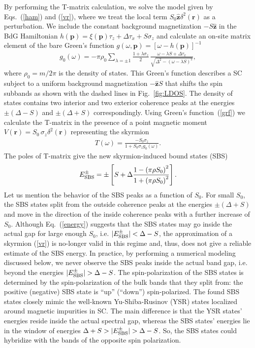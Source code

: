 \documentclass[twocolumn,showpacs,floatfix,longbibliography]{revtex4-1}
\begin{document}
By performing the T-matrix calculation, we solve the model given by Eqs.~(\ref{ham}) and (\ref{vr}), where we treat the local term $S_0 \hat{\bm z} \delta^2(\bm r)$ as a perturbation. We include the constant background magnetization $-S\hat{\bm z}$ in the BdG Hamiltonian $h(\bm p) = \xi(\bm p)\tau_z+\Delta \tau_x +  S\sigma_z$ and calculate an on-site matrix element of the bare Green's function $g(\omega,\bm p) = [\omega-h(\bm p)]^{-1}$ 
 \begin{align}
	 g_{0}(\omega)  =-\pi\rho_0\sum_{\lambda = \pm 1} \frac{1+\lambda\sigma_z}{2}\,\frac{\omega-\lambda S+\Delta\tau_x}{\sqrt{\Delta^2-\left( \omega-\lambda S \right)^2}},  \label{grf}
\end{align}
where $\rho_0 = m/2\pi$ is the density of states. This Green's function describes a SC subject to a uniform background magnetization $-\hat{\bm z} S$ that shifts the spin subbands as shown with the dashed lines in Fig.~\ref{fig:LDOS}.  The density of states contains two interior and two exterior coherence peaks at the energies $\pm(\Delta-S)$ and $\pm(\Delta+S)$ correspondingly.  Using Green's function~(\ref{grf}) we calculate the T-matrix in the presence of a point magnetic moment $V(\bm r)=S_0\,\sigma_z \delta^2(\bm r)$ representing the skyrmion
\begin{align}
	T(\omega) =   \frac{-S_0\sigma_z}{1+S_0\sigma_zg_{0}(\omega)}. \label{tm} 
\end{align}
The poles of T-matrix give the new skyrmion-induced bound states (SBS)
\begin{align}
	E^\pm_{\rm SBS} = \pm\left[S+\Delta \frac{1-\left( \pi\rho S_0 \right)^2}{1+\left( \pi\rho S_0 \right)^2}\right].
	\label{energy}
\end{align}
Let us mention the behavior of the SBS peaks as a function of $S_0$. For small $S_0$, the SBS states split from the outside coherence peaks at the energies $\pm (\Delta+S)$ and move in the direction of the inside coherence peaks with a further increase of $S_0$. Although Eq.~(\ref{energy}) suggests that the SBS states may go inside the actual gap for large enough  $S_0$, i.e. $|E^\pm_{\rm SBS}|<\Delta-S$, the approximation of a skyrmion (\ref{vr}) is no-longer valid in this regime and, thus, does not give a reliable estimate of the SBS energy. In practice, by performing a numerical modeling discussed below, we never observe the SBS peaks inside the actual band gap, i.e. beyond the energies $|E^\pm_{\rm SBS}|>\Delta-S$. The spin-polarization of the SBS states is determined by the spin-polarization of the bulk bands that they split from: the positive (negative) SBS state is ``up'' (``down'') spin-polarized. The found SBS states closely mimic the well-known Yu-Shiba-Rusinov (YSR) states \cite{Yu,Shiba,Rusinov,Balatsky2006} localized around magnetic impurities in SC. The main difference is that the YSR states' energies reside inside the actual spectral gap, whereas the SBS states' energies lie in the window of energies $\Delta+S>|E^\pm_{\rm SBS}|>\Delta-S$. So, the SBS states could hybridize with the bands of the opposite spin polarization.  
\end{document}
